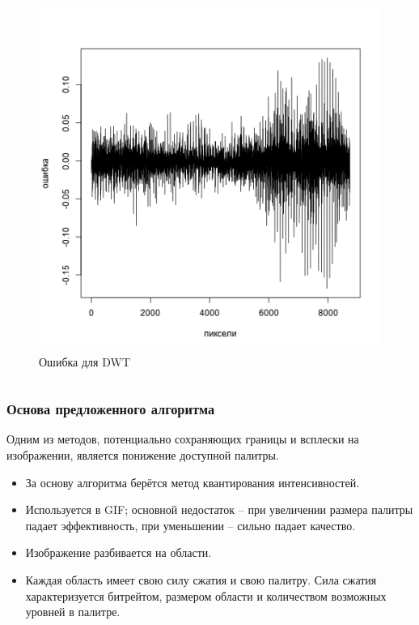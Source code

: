 \documentclass{beamer}
\begin{document}
\begin{frame}
\begin{columns}[T]
  \begin{column}{0.45\textwidth}
    \begin{figure}
      \includegraphics[height=0.3\textheight]{img/field/diffplot}
      \caption{Ошибка для DWT}
    \end{figure}
  \end{column}
\end{columns}

\end{frame}

\begin{frame}
\frametitle{Основа предложенного алгоритма}

Одним из методов, потенциально сохраняющих границы и всплески на изображении,
является понижение доступной палитры.

\begin{itemize}
  \item За основу алгоритма берётся метод квантирования интенсивностей.
  \item Используется в GIF; основной недостаток -- при увеличении размера
    палитры падает эффективность, при уменьшении -- сильно падает качество.
  \item Изображение разбивается на области.
  \item Каждая область имеет свою силу сжатия и свою палитру. Сила сжатия
    характеризуется битрейтом, размером области и количеством возможных уровней
    в палитре.
\end{itemize}

\end{frame}
\end{document}
